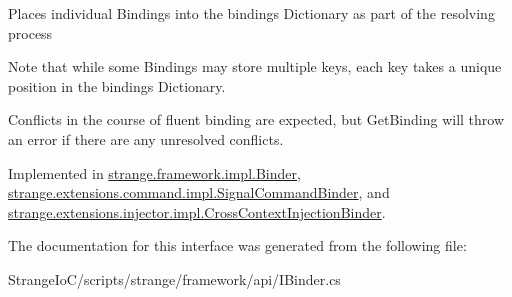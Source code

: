 Places individual Bindings into the bindings Dictionary as part of the resolving process 

Note that while some Bindings may store multiple keys, each key takes a unique position in the bindings Dictionary.

Conflicts in the course of fluent binding are expected, but Get\-Binding will throw an error if there are any unresolved conflicts. 

Implemented in \hyperlink{classstrange_1_1framework_1_1impl_1_1_binder_a59b9ca38325bf6cf4c55aa309e92d00c}{strange.\-framework.\-impl.\-Binder}, \hyperlink{classstrange_1_1extensions_1_1command_1_1impl_1_1_signal_command_binder_a8968e1632b03d1f9223f8e66e721327f}{strange.\-extensions.\-command.\-impl.\-Signal\-Command\-Binder}, and \hyperlink{classstrange_1_1extensions_1_1injector_1_1impl_1_1_cross_context_injection_binder_ad93ea865f14a6249af575633f6472a7e}{strange.\-extensions.\-injector.\-impl.\-Cross\-Context\-Injection\-Binder}.



The documentation for this interface was generated from the following file\-:\begin{DoxyCompactItemize}
\item 
Strange\-Io\-C/scripts/strange/framework/api/I\-Binder.\-cs\end{DoxyCompactItemize}
